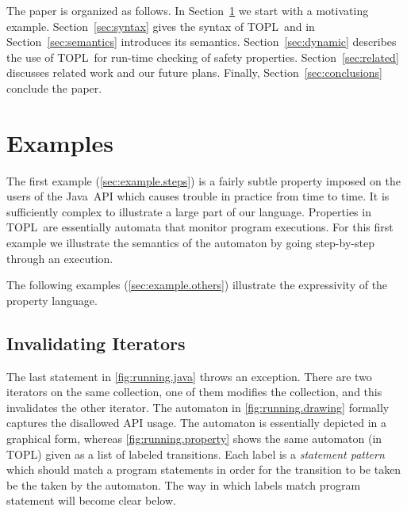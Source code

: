 \documentclass[preprint]{sigplanconf} %
\newcommand{\TPL}{TOPL}
\theoremstyle{definition}
\theoremstyle{remark}
\begin{document}
The paper is organized as follows. In Section~\ref{sec:example} we start with a motivating example. 
Section~\ref{sec:syntax} gives the syntax of \TPL \ and in Section~\ref{sec:semantics} introduces its semantics. 
Section~\ref{sec:dynamic} describes the use of \TPL \ for run-time checking of safety properties.
Section~\ref{sec:related} discusses related work and our future plans. 
Finally, Section~\ref{sec:conclusions} conclude the paper.
\section{Examples} \label{sec:example} %

The first example (\autoref{sec:example.steps}) is a fairly subtle property imposed on the users of the Java~API which causes trouble in practice from time to time.
It is sufficiently complex to illustrate a large part of our language.
Properties in \TPL \ are essentially automata that monitor program executions.
For this first example we illustrate the semantics of the automaton by going step-by-step through an execution.

The following examples (\autoref{sec:example.others}) illustrate the expressivity of the property language.

\subsection{Invalidating Iterators} \label{sec:example.steps} %

The last statement in \autoref{fig:running.java} throws an exception.
There are two iterators on the same collection, one of them modifies the collection, and this invalidates the other iterator.
The automaton in \autoref{fig:running.drawing} formally captures the disallowed API usage.
The automaton is essentially depicted  in a graphical form, whereas  \autoref{fig:running.property} shows the same automaton (in \TPL ) given  as a list of labeled transitions. 
Each label is a {\em statement pattern} which should match  a program statements in order for the transition to be taken be the taken by the automaton.
The way in which labels match program statement will become clear below.
 
\end{document}
